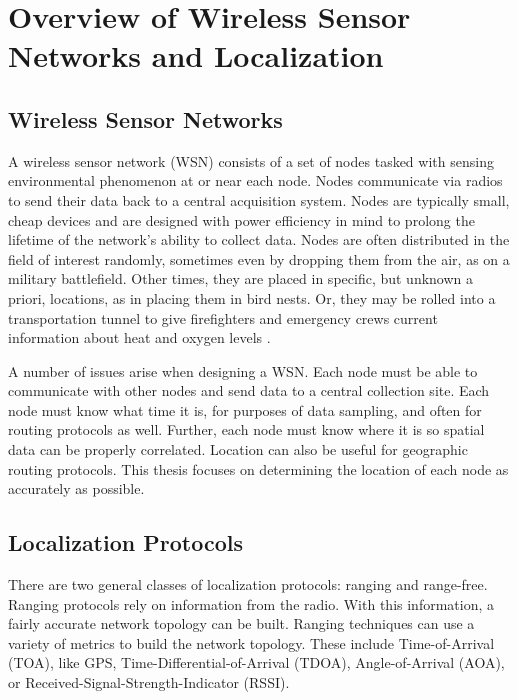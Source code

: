 \chapter{Overview of Wireless Sensor Networks and Localization}
\section{Wireless Sensor Networks}

A wireless sensor network (WSN) consists of a set of nodes tasked with sensing environmental phenomenon at or near each node.  Nodes communicate via radios to send their data back to a central acquisition system.  Nodes are typically small, cheap devices and are designed with power efficiency in mind to prolong the lifetime of the network's ability to collect data.  Nodes are often distributed in the field of interest randomly, sometimes even by dropping them from the air, as on a military battlefield.  Other times, they are placed in specific, but unknown a priori, locations, as in placing them in bird nests\cite{birds}.  Or, they may be rolled into a transportation tunnel to give firefighters and emergency crews current information about heat and oxygen levels \cite{runes}.

A number of issues arise when designing a WSN.  Each node must be able to communicate with  other nodes and send data to a central collection site.  Each node must know what time it is, for purposes of data sampling, and often for routing protocols as well.  Further, each node must know where it is so spatial data can be properly correlated.  Location can also be useful for geographic routing protocols.  This thesis focuses on determining the location of each node as accurately as possible.

\section{Localization Protocols}

There are two general classes of localization protocols: ranging and range-free. Ranging protocols rely on information from the radio. With this information, a fairly accurate network topology can be built.  Ranging techniques can use a variety of metrics to build the network topology.  These include Time-of-Arrival (TOA), like GPS\cite{Wellenhoff},  Time-Differential-of-Arrival (TDOA)\cite{Savvides}, Angle-of-Arrival (AOA)\cite{APS-AOA}, or Received-Signal-Strength-Indicator (RSSI)\cite{Patwari}.  


